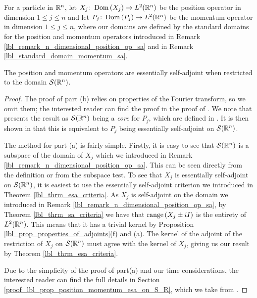 \begin{proposition}\label{lbl_prop_position_momentum_esa_on_S_R}
  For a particle in $\mathbb{R}^n$, let $X_j \colon \operatorname{Dom}\left(X_j\right) \to L^2(\mathbb{R}^n)$ be the position operator in dimension $1 \leq j \leq n$ and let $P_j \colon \operatorname{Dom}\left(P_j\right) \to L^2(\mathbb{R}^n)$ be the momentum operator in dimension $1 \leq j \leq n$, where our domains are defined by the standard domains for the position and momentum operators introduced in Remark \eqref{lbl_remark_n_dimensional_position_op_sa} and in Remark \eqref{lbl_standard_domain_momentum_sa}.

  \medskip

  The position and momentum operators are essentially self-adjoint when restricted to the domain $\mathcal{S}(\mathbb{R}^n)$.
\end{proposition}
\begin{proof}
  The proof of part (b) relies on properties of the Fourier transform, so we omit them; the interested reader can find the proof in the proof of {\cite[Proposition 5.29]{moretti}}. We note that {\cite[Proposition 5.29]{moretti}} presents the result as $\mathcal{S}(\mathbb{R}^n)$ being a {\emph{core}} for $P_j$,  which are defined in {\cite[Definition 5.20]{moretti}}. It is then shown in {\cite[Proposition 5.21]{moretti}} that this is equivalent to $P_j$ being essentially self-adjoint on $\mathcal{S}(\mathbb{R}^n)$.

  \medskip

  The method for part (a) is fairly simple. Firstly, it is easy to see that $\mathcal{S}(\mathbb{R}^n)$ is a subspace of the domain of $X_j$ which we introduced in Remark \eqref{lbl_remark_n_dimensional_position_op_sa}. This can be seen directly from the definition or from the subspace test. To see that $X_j$ is essentially self-adjoint on $\mathcal{S}(\mathbb{R}^n)$, it is easiest to use the essentially self-adjoint criterion we introduced in Theorem \eqref{lbl_thrm_esa_criteria}. As $X_j$ is self-adjoint on the domain we introduced in Remark \eqref{lbl_remark_n_dimensional_position_op_sa}, by Theorem \eqref{lbl_thrm_sa_criteria} we have that $\operatorname{range}\left(X_j \pm iI\right)$ is the entirety of $L^2(\mathbb{R}^n)$. This means that it has a trivial kernel by Proposition \eqref{lbl_prop_properties_of_adjoints}(f) and (a). The kernel of the adjoint of the restriction of $X_j$ on $\mathcal{S}(\mathbb{R}^n)$ must agree with the kernel of $X_j$, giving us our result by Theorem \eqref{lbl_thrm_esa_criteria}.

  \medskip

  Due to the simplicity of the proof of part(a) and our time considerations, the interested reader can find the full details in Section \eqref{proof_lbl_prop_position_momentum_esa_on_S_R}, which we take from {\cite[Proposition 5.23, 5.29]{moretti}}.
\end{proof}
